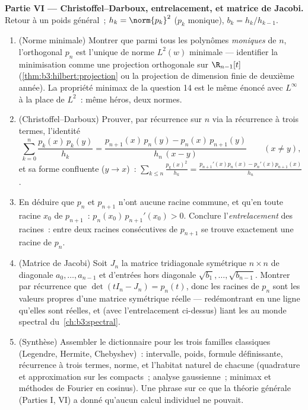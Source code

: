 \begin{problem}
\medskip
\noindent\textbf{Partie VI --- Christoffel--Darboux,
entrelacement, et matrice de Jacobi.} Retour à un poids
général~; $h_k = \norm{p_k}^2$ ($p_k$ monique), $b_k =
h_k/h_{k-1}$.
\begin{enumerate}[resume]
  \item (Norme minimale) Montrer que parmi tous les polynômes
        \emph{moniques} de  $n$, l'orthogonal $p_n$ est
        l'unique de norme $L^2(w)$ minimale --- identifier
        la minimisation comme une projection orthogonale sur
        $\R_{n-1}[t]$ (\cref{thm:b3:hilbert:projection} ou
        la projection de dimension finie de deuxième année).
        La propriété minimax de la question 14 est le même
        énoncé avec $L^\infty$ à la place de $L^2$~: même
        héros, deux normes.
  \item (Christoffel--Darboux) Prouver, par récurrence sur
        $n$ via la récurrence à trois termes, l'identité
        \[
        \sum_{k=0}^{n}\frac{p_k(x)\,p_k(y)}{h_k}
        = \frac{p_{n+1}(x)\,p_n(y) -
        p_n(x)\,p_{n+1}(y)}{h_n\,(x - y)}
        \qquad (x \neq y),
        \]
        et sa forme confluente ($y \to x$)~:
        $\sum_{k\leq n}\frac{p_k(x)^2}{h_k} =
        \frac{p_{n+1}'(x)p_n(x) - p_n'(x)p_{n+1}(x)}{h_n}$.
  \item En déduire que $p_n$ et $p_{n+1}$ n'ont aucune racine
        commune, et qu'en toute racine $x_0$ de $p_{n+1}$~:
        $p_n(x_0)\,p_{n+1}'(x_0) > 0$. Conclure
        l'\emph{entrelacement} des racines~: entre deux
        racines consécutives de $p_{n+1}$ se trouve
        exactement une racine de $p_n$.
  \item (Matrice de Jacobi) Soit $J_n$ la matrice tridiagonale
        symétrique $n\times n$ de diagonale $a_0, \dots,
        a_{n-1}$ et d'entrées hors diagonale $\sqrt{b_1},
        \dots, \sqrt{b_{n-1}}$. Montrer par récurrence que
        $\det(tI_n - J_n) = p_n(t)$, donc les racines de
        $p_n$ sont les valeurs propres d'une matrice
        symétrique réelle --- redémontrant en une ligne
        qu'elles sont réelles, et (avec l'entrelacement
        ci-dessus) liant les  au monde
        spectral du~\cref{ch:b3:spectral}.
  \item (Synthèse) Assembler le dictionnaire pour les trois
        familles classiques (Legendre, Hermite, Chebyshev)~:
        intervalle, poids, formule définissante, récurrence à
        trois termes, norme, et l'habitat naturel de chacune
        (quadrature et approximation sur les compacts~;
        analyse gaussienne~; minimax et méthodes de Fourier
        en cosinus). Une phrase sur ce que la théorie
        générale (Parties I, VI) a donné qu'aucun calcul
        individuel ne pouvait.
\end{enumerate}


\end{problem}
